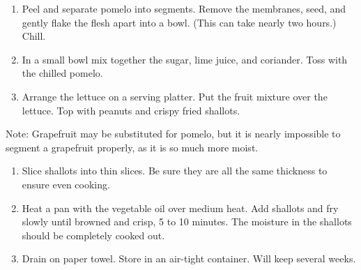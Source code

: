 


\begin{ingredients}
\end{ingredients}


\begin{recipe}
  \begin{enumerate}

  \item Peel and separate pomelo into segments.  Remove the membranes,
    seed, and gently flake the flesh apart into a bowl.  (This can
    take nearly two hours.)  Chill.

  \item In a small bowl mix together the sugar, lime juice, and
    coriander.  Toss with the chilled pomelo.

  \item Arrange the lettuce on a serving platter.  Put the fruit
    mixture over the lettuce.  Top with peanuts and crispy fried
    shallots.

  \end{enumerate}
\end{recipe}

Note: Grapefruit may be substituted for pomelo, but it is nearly
impossible to segment a grapefruit properly, as it is so much more
moist.



\begin{ingredients}
\end{ingredients}


\begin{recipe}
  \begin{enumerate}

  \item Slice shallots into thin slices.  Be sure they are all the
    same thickness to ensure even cooking.

  \item Heat a pan with the vegetable oil over medium heat. Add
    shallots and fry slowly until browned and crisp, 5 to 10 minutes.
    The moisture in the shallots should be completely cooked out.

  \item Drain on paper towel. Store in an air-tight container.  Will
    keep several weeks.

  \end{enumerate}
\end{recipe}

